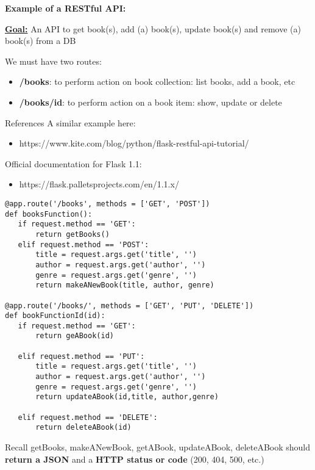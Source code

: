 \documentclass{beamer}[10pt, usepdftitle=false handout]
\begin{document}
\begin{frame}
\textbf{Example of a RESTful API:}
\vspace*{0.6em}

\underline{\textbf{Goal:}} An API to get book(s), add (a) book(s), update book(s) and remove (a) book(s) from a DB
\vspace*{0.6em}

We must have two routes:
\vspace*{0.6em}

\begin{itemize}
\item{\textbf{/books}: to perform action on book collection: list books, add a book, etc}
\item{\textbf{/books/id}: to perform action on a book item: show, update or delete}
\end{itemize}

\begin{block}{References}
A similar example here: 
\begin{itemize}
\item{https://www.kite.com/blog/python/flask-restful-api-tutorial/}
\end{itemize}
Official documentation for Flask 1.1: 
\begin{itemize}
\item{https://flask.palletsprojects.com/en/1.1.x/}
\end{itemize}
\end{block}

\end{frame}
\begin{frame}[fragile]
\begingroup
\fontsize{6pt}{8pt}\selectfont
\begin{verbatim}
@app.route('/books', methods = ['GET', 'POST'])
def booksFunction():
   if request.method == 'GET':
       return getBooks()
   elif request.method == 'POST':
       title = request.args.get('title', '')
       author = request.args.get('author', '')
       genre = request.args.get('genre', '')
       return makeANewBook(title, author, genre)

@app.route('/books/', methods = ['GET', 'PUT', 'DELETE'])
def bookFunctionId(id):
   if request.method == 'GET':
       return geABook(id)
 
   elif request.method == 'PUT':
       title = request.args.get('title', '')
       author = request.args.get('author', '')
       genre = request.args.get('genre', '')
       return updateABook(id,title, author,genre)
  
   elif request.method == 'DELETE':
       return deleteABook(id)
\end{verbatim} 
\endgroup      
       
\begin{block}{Recall}
getBooks, makeANewBook, getABook, updateABook, deleteABook should \textbf{return a JSON} and a \textbf{HTTP status or code} (200, 404, 500, etc.)
\end{block}       
       
\end{frame}
\end{document}
